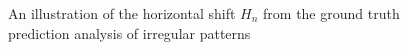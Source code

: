 \documentclass[preprint,3p,times,twocolumn]{elsarticle}  %
\begin{document}
\begin{figure}%
%
\centering
{}
%
\caption{An illustration of the horizontal shift $H_n$ from 
the ground truth prediction analysis of irregular patterns}\label{fig:3}
\end{figure}
\end{document}
